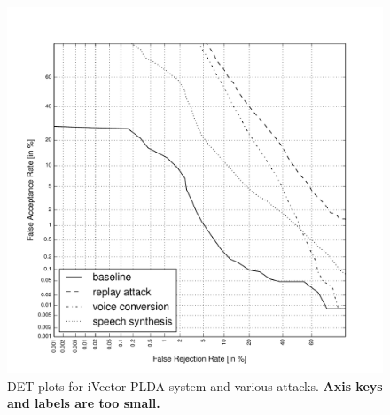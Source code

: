 

\begin{figure}[!t]
	\centering
	\includegraphics[width=1\linewidth]{Figs/DETs_IV_ss_vc_rp.pdf}
	\caption{DET plots for iVector-PLDA system and various attacks. {\bfseries Axis keys and labels are too small.}}
	\label{fig::DETs_4attacks}
\end{figure}

